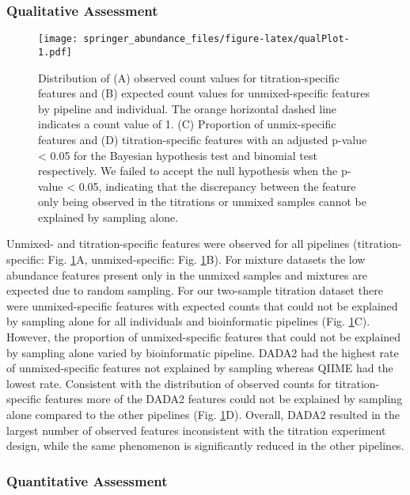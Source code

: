 \documentclass[smallextended]{svjour3}       %
\begin{document}
\hypertarget{qualitative-assessment-1}{%
\subsubsection{Qualitative Assessment}\label{qualitative-assessment-1}}

\begin{figure}
\centering
\texttt{[image: springer\_abundance\_files/figure-latex/qualPlot-1.pdf]}
\caption{\label{fig:qualPlot}Distribution of (A) observed count values for
titration-specific features and (B) expected count values for
unmixed-specific features by pipeline and individual. The orange
horizontal dashed line indicates a count value of 1. (C) Proportion of
unmix-specific features and (D) titration-specific features with an
adjusted p-value \textless{} 0.05 for the Bayesian hypothesis test and
binomial test respectively. We failed to accept the null hypothesis when
the p-value \textless{} 0.05, indicating that the discrepancy between
the feature only being observed in the titrations or unmixed samples
cannot be explained by sampling alone.}
\end{figure}

Unmixed- and titration-specific features were observed for all pipelines
(titration-specific: Fig. \ref{fig:qualPlot}A, unmixed-specific: Fig.
\ref{fig:qualPlot}B). For mixture datasets the low abundance features
present only in the unmixed samples and mixtures are expected due to
random sampling. For our two-sample titration dataset there were
unmixed-specific features with expected counts that could not be
explained by sampling alone for all individuals and bioinformatic
pipelines (Fig. \ref{fig:qualPlot}C). However, the proportion of
unmixed-specific features that could not be explained by sampling alone
varied by bioinformatic pipeline. DADA2 had the highest rate of
unmixed-specific features not explained by sampling whereas QIIME had
the lowest rate. Consistent with the distribution of observed counts for
titration-specific features more of the DADA2 features could not be
explained by sampling alone compared to the other pipelines (Fig.
\ref{fig:qualPlot}D). Overall, DADA2 resulted in the largest number of
observed features inconsistent with the titration experiment design,
while the same phenomenon is significantly reduced in the other
pipelines.

\hypertarget{quantitative-assessment-1}{%
\subsubsection{Quantitative
Assessment}\label{quantitative-assessment-1}}
\end{document}
